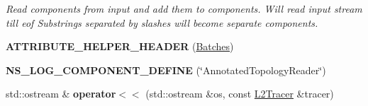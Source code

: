 \begin{DoxyCompactItemize}
\begin{DoxyCompactList}\small\item\em Read components from input and add them to components. Will read input stream till eof Substrings separated by slashes will become separate components. \end{DoxyCompactList}\item 
{\bfseries A\+T\+T\+R\+I\+B\+U\+T\+E\+\_\+\+H\+E\+L\+P\+E\+R\+\_\+\+H\+E\+A\+D\+ER} (\hyperlink{classns3_1_1Batches}{Batches})\hypertarget{namespacens3_a0f4a213a000e51344c8a2a2150f71d35}{}\label{namespacens3_a0f4a213a000e51344c8a2a2150f71d35}

\item 
{\bfseries N\+S\+\_\+\+L\+O\+G\+\_\+\+C\+O\+M\+P\+O\+N\+E\+N\+T\+\_\+\+D\+E\+F\+I\+NE} (\char`\"{}Annotated\+Topology\+Reader\char`\"{})\hypertarget{namespacens3_adefe2287381fb28c49c86edfe978590f}{}\label{namespacens3_adefe2287381fb28c49c86edfe978590f}

\item 
std\+::ostream \& {\bfseries operator$<$$<$} (std\+::ostream \&os, const \hyperlink{classns3_1_1L2Tracer}{L2\+Tracer} \&tracer)\hypertarget{namespacens3_a6b06290ef49ec3c98a4fdd0059c6371b}{}\label{namespacens3_a6b06290ef49ec3c98a4fdd0059c6371b}

\end{DoxyCompactItemize}
